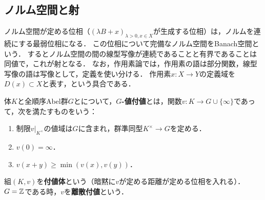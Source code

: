 \documentclass[uplatex,dvipdfmx]{jsreport}
\begin{document}
\subsection{ノルム空間と射}

\begin{tcolorbox}[colframe=ForestGreen, colback=ForestGreen!10!white,breakable,colbacktitle=ForestGreen!40!white,coltitle=black,fonttitle=\bfseries\sffamily,
title=]
    ノルム空間が定める位相（$(\lambda B+x)_{\lambda>0,x\in X}$が生成する位相）は，ノルムを連続にする最弱位相になる．
    この位相について完備なノルム空間をBanach空間という．
    するとノルム空間の間の線型写像が連続であることと有界であることは同値で，これが射となる．
    なお，作用素論では，作用素の語は部分関数，線型写像の語は写像として，定義を使い分ける．
    作用素$x:X\to Y$の定義域を$D(x)\subset X$と表す，という具合である．
\end{tcolorbox}

\begin{definition}
    体$K$と全順序Abel群$G$とについて，\textbf{$G$-値付値}とは，関数$v:K\to G\cup\{\infty\}$であって，次を満たすものをいう：
    \begin{enumerate}
        \item 制限$v|_{K^\times}$の値域は$G$に含まれ，群準同型$K^\times\to G$を定める．
        \item $v(0)=\infty$．
        \item $v(x+y)\ge\min(v(x),v(y))$．
    \end{enumerate}
    組$(K,v)$を\textbf{付値体}という（暗黙に$v$が定める距離が定める位相を入れる）．$G=\mathbb{Z}$である時，$v$を\textbf{離散付値}という．
\end{definition}
\end{document}
